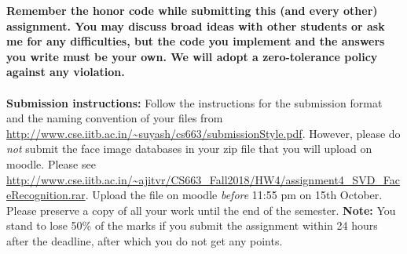 \documentclass[11pt]{article}
\begin{document}
\maketitle

\textbf{Remember the honor code while submitting this (and every other) assignment. You may discuss broad ideas with other students or ask me for any difficulties, but the code you implement and the answers you write must be your own. We will adopt a \textbf{zero-tolerance policy} against any violation.}
\\
\\
\textbf{Submission instructions:} Follow the instructions for the submission format and the naming convention of your files from \url{http://www.cse.iitb.ac.in/~suyash/cs663/submissionStyle.pdf}. However, please do \emph{not} submit the face image databases in your zip file that you will upload on moodle. Please see \url{http://www.cse.iitb.ac.in/~ajitvr/CS663_Fall2018/HW4/assignment4_SVD_FaceRecognition.rar}. Upload the file on moodle \emph{before} 11:55 pm on 15th October.  Please preserve a copy of all your work until the end of the semester.  \textbf{Note:} You stand to lose 50\% of the marks if you submit the assignment within 24 hours after the deadline, after which you do not get any points.
\end{document}

